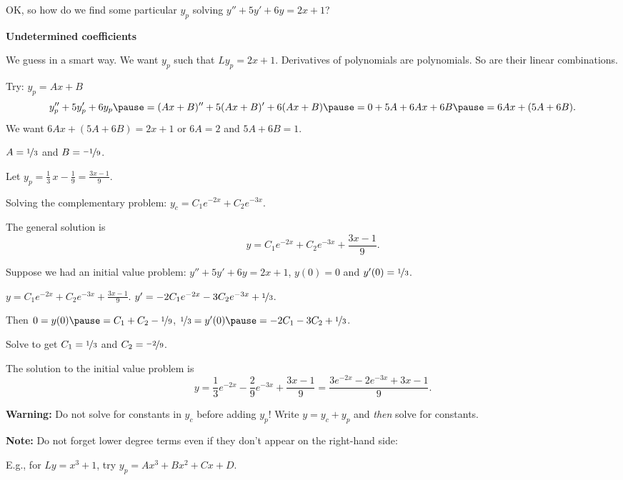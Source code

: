 \documentclass[10pt,aspectratio=169]{beamer}
\begin{document}
\begin{frame}
OK, so how do we find some particular $y_p$ solving
$y'' + 5y'+ 6y = 2x+1$?

\medskip
\pause

\textbf{Undetermined coefficients}

\medskip
\pause

We guess in a smart way.
We want $y_p$ such that $Ly_p = 2x+1$.
\pause
Derivatives of polynomials are polynomials.
\pause
So are their linear combinations.

\medskip
\pause

Try: \quad $y_p = Ax + B$
\pause
\[
y_p'' + 5y_p'+ 6y_p  \pause =
(Ax+B)'' + 5(Ax+B)' + 6(Ax+B)
\pause  = 
0 + 5A + 6Ax + 6B
\pause
= 6Ax+ (5A+6B) .
\]
\pause
We want \quad $6Ax+(5A+6B) = 2x+1$ \quad or \quad $6A=2$ and $5A+6B=1$.

\medskip
\pause

\thus \quad  $A = \nicefrac{1}{3}$ and $B = \nicefrac{-1}{9}$.

\medskip
\pause

Let \quad $\displaystyle y_p = \frac{1}{3}\, x - \frac{1}{9} = \frac{3x-1}{9}$.

\medskip
\pause

Solving the complementary problem:
\quad
$y_c = C_1 e^{-2x} + C_2 e^{-3x}$.

\medskip
\pause

The general solution is
\[
y = C_1 e^{-2x} + C_2 e^{-3x} + \frac{3x-1}{9} .
\]
\end{frame}

\begin{frame}
Suppose we had an initial value problem:
\quad $y'' + 5y'+ 6y = 2x+1$, \quad
$y(0) = 0$ and $y'(0) = \nicefrac{1}{3}$.

\medskip
\pause

\quad $y = C_1 e^{-2x} + C_2 e^{-3x} + \frac{3x-1}{9}$.
\qquad
\pause
$y' = - 2C_1 e^{-2x} - 3C_2 e^{-3x} + \nicefrac{1}{3}$.

\medskip
\pause
Then
$0 = y(0) \pause = C_1 + C_2 -\nicefrac{1}{9}$, \pause \qquad
$\nicefrac{1}{3} = y'(0) \pause = - 2C_1 - 3C_2 + \nicefrac{1}{3}$.
\medskip
\pause

Solve to get $C_1 = \nicefrac{1}{3}$ and $C_2 = \nicefrac{-2}{9}$.

\medskip
\pause

The solution to the initial value problem is
\[
y = \frac{1}{3} e^{-2x} - \frac{2}{9} e^{-3x} + \frac{3x-1}{9} =
\frac{3 e^{-2x} - 2 e^{-3x} + 3x-1}{9} .
\]
\pause

\textbf{Warning:}
Do not solve for constants in $y_c$ before adding $y_p$!
Write $y=y_c+y_p$ and \textit{then} solve for constants.

\medskip
\pause

\textbf{Note:}
Do not forget lower degree terms even if they don't appear on the right-hand
side:

\medskip

E.g., for \quad $Ly = x^3+1$, \quad try $y_p = Ax^3+Bx^2+Cx+D$.

\end{frame}
\end{document}
